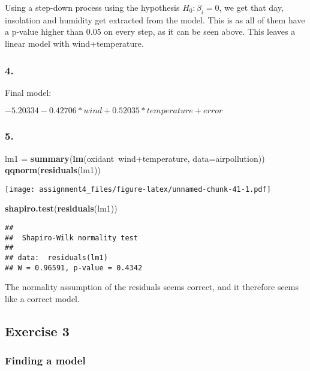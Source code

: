 \documentclass[11pt,]{article}
\newenvironment{Shaded}{\begin{snugshade}}{\end{snugshade}}
\newcommand{\KeywordTok}[1]{\textcolor[rgb]{0.13,0.29,0.53}{\textbf{{#1}}}}
\newcommand{\DataTypeTok}[1]{\textcolor[rgb]{0.13,0.29,0.53}{{#1}}}
\newcommand{\StringTok}[1]{\textcolor[rgb]{0.31,0.60,0.02}{{#1}}}
\newcommand{\NormalTok}[1]{{#1}}
\begin{document}
Using a step-down process using the hypothesis \(H_0:\beta_i=0\), we get
that day, insolation and humidity get extracted from the model. This is
as all of them have a p-value higher than 0.05 on every step, as it can
be seen above. This leaves a linear model with wind+temperature.

\subsubsection{4.}\label{section-27}

Final model:

\(-5.20334 - 0.42706*wind + 0.52035*temperature + error\)

\subsubsection{5.}\label{section-28}

\begin{Shaded}
\begin{Highlighting}[]
\NormalTok{lm1 =}\StringTok{ }\KeywordTok{summary}\NormalTok{(}\KeywordTok{lm}\NormalTok{(oxidant~wind+temperature, }\DataTypeTok{data=}\NormalTok{airpollution))}
\KeywordTok{qqnorm}\NormalTok{(}\KeywordTok{residuals}\NormalTok{(lm1))}
\end{Highlighting}
\end{Shaded}

\texttt{[image: assignment4\_files/figure-latex/unnamed-chunk-41-1.pdf]}

\begin{Shaded}
\begin{Highlighting}[]
\KeywordTok{shapiro.test}\NormalTok{(}\KeywordTok{residuals}\NormalTok{(lm1))}
\end{Highlighting}
\end{Shaded}

\begin{verbatim}
## 
##  Shapiro-Wilk normality test
## 
## data:  residuals(lm1)
## W = 0.96591, p-value = 0.4342
\end{verbatim}

The normality assumption of the residuals seems correct, and it
therefore seems like a correct model.

\subsection{Exercise 3}\label{exercise-3}

\subsubsection{Finding a model}\label{finding-a-model}
\end{document}
